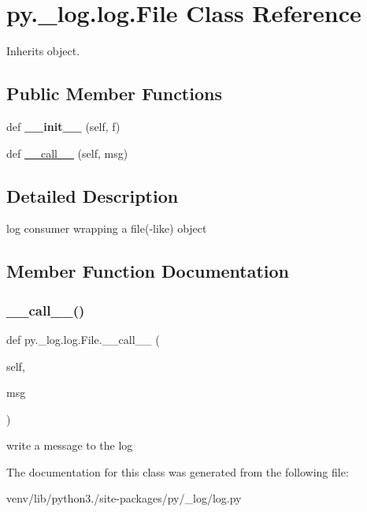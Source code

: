\hypertarget{classpy_1_1__log_1_1log_1_1_file}{}\section{py.\+\_\+log.\+log.\+File Class Reference}
\label{classpy_1_1__log_1_1log_1_1_file}


Inherits object.

\subsection*{Public Member Functions}
\begin{DoxyCompactItemize}
\item 
\mbox{\label{classpy_1_1__log_1_1log_1_1_file_a8de47bf6ccf17b4e48df042d687d1d9e}} 
def {\bfseries \+\_\+\+\_\+init\+\_\+\+\_\+} (self, f)
\item 
def \hyperlink{classpy_1_1__log_1_1log_1_1_file_a5003443dd972fc28ffb90e094cb97dff}{\+\_\+\+\_\+call\+\_\+\+\_\+} (self, msg)
\end{DoxyCompactItemize}


\subsection{Detailed Description}
\begin{DoxyVerb}log consumer wrapping a file(-like) object \end{DoxyVerb}
 

\subsection{Member Function Documentation}
\mbox{\label{classpy_1_1__log_1_1log_1_1_file_a5003443dd972fc28ffb90e094cb97dff}} 
\subsubsection{\texorpdfstring{\+\_\+\+\_\+call\+\_\+\+\_\+()}{\_\_call\_\_()}}
{\footnotesize\ttfamily def py.\+\_\+log.\+log.\+File.\+\_\+\+\_\+call\+\_\+\+\_\+ (\begin{DoxyParamCaption}\item[{}]{self,  }\item[{}]{msg }\end{DoxyParamCaption})}

\begin{DoxyVerb}write a message to the log \end{DoxyVerb}
 

The documentation for this class was generated from the following file\+:\begin{DoxyCompactItemize}
\item 
venv/lib/python3./site-\/packages/py/\+\_\+log/log.\+py\end{DoxyCompactItemize}
